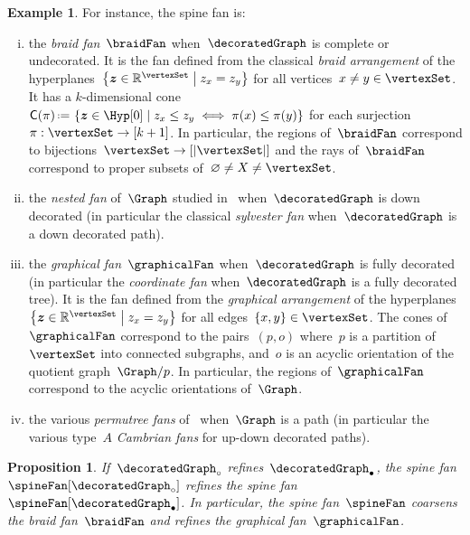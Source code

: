 \documentclass{amsart}
\newtheorem{proposition}[theorem]{Proposition}
\theoremstyle{definition}
\newtheorem{example}[theorem]{Example}
\newcommand{\R}{\mathbb{R}} %
\renewcommand{\b}[1]{{\boldsymbol{#1}}} %
\newcommand{\set}[2]{\left\{ #1 \;\middle|\; #2 \right\}} %
\newcommand{\eqdef}{\mbox{\,\raisebox{0.2ex}{\scriptsize\ensuremath{\mathrm:}}\ensuremath{=}\,}} %
\newcommand{\darkblue}{\color{darkblue}} %
\newcommand{\defn}[1]{\textsl{\darkblue #1}} %
\newcommand{\normalCone}{\mathsf{C}} %
\begin{document}
\begin{example}
  \label{exm:spineFans}
  For instance, the spine fan is:
  \begin{enumerate}[(i)]
    \item the \defn{braid fan}~$\braidFan$ when~$\decoratedGraph$ is complete or undecorated. It is the fan defined from the classical \defn{braid arrangement} of the hyperplanes~$\set{\b{z} \in \R^{\vertexSet}}{z_x = z_y}$ for all vertices~$x \ne y \in \vertexSet$. It has a $k$-dimensional cone~$\normalCone(\pi) \eqdef \set{\b{z} \in \Hyp[0]}{z_x \le z_y \iff \pi(x) \le \pi(y)}$ for each surjection~$\pi : \vertexSet \to [k+1]$. In particular, the regions of~$\braidFan$ correspond to bijections~${\vertexSet \to [|\vertexSet|]}$ and the rays of~$\braidFan$ correspond to proper subsets of~$\varnothing \ne X \ne \vertexSet$.
    \item the \defn{nested fan} of~$\Graph$ studied in~\cite{CarrDevadoss, Zelevinsky} when~$\decoratedGraph$ is down decorated (in particular the classical \defn{sylvester fan} when~$\decoratedGraph$ is a down decorated path).
    \item the \defn{graphical fan}~$\graphicalFan$ when~$\decoratedGraph$ is fully decorated (in particular the \defn{coordinate fan} when~$\decoratedGraph$ is a fully decorated tree). It is the fan defined from the \defn{graphical arrangement} of the hyperplanes~$\set{\b{z} \in \R^{\vertexSet}}{z_x = z_y}$ for all edges~$\{x, y\} \in \vertexSet$. The cones of~$\graphicalFan$ correspond to the pairs~$(p,o)$ where~$p$ is a partition of~$\vertexSet$ into connected subgraphs, and~$o$ is an acyclic orientation of the quotient graph~$\Graph/p$. In particular, the regions of~$\graphicalFan$ correspond to the acyclic orientations of~$\Graph$.
    \item the various \defn{permutree fans} of~\cite{PilaudPons-permutrees} when~$\Graph$ is a path (in particular the various type~$A$ \defn{Cambrian fans} for up-down decorated paths).
  \end{enumerate}
\end{example}

\begin{proposition}
  \label{prop:refinementSpineFan}
  If~$\decoratedGraph_\circ$ refines~$\decoratedGraph_\bullet$, the spine fan~$\spineFan[\decoratedGraph_\circ]$ refines the spine fan~$\spineFan[\decoratedGraph_\bullet]$.
  In particular, the spine fan~$\spineFan$ coarsens the braid fan~$\braidFan$ and refines the graphical fan~$\graphicalFan$.
\end{proposition}
\end{document}
